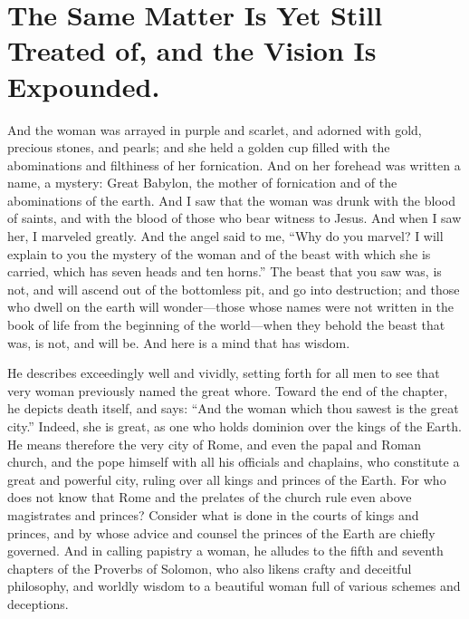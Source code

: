 \chapter[Sermon 74. The Same Matter Is Yet Still Treated of, and the Vision Is Expounded.]{The Same Matter Is Yet Still Treated of, and the Vision Is Expounded.}
\label{sermon:074}

And the woman was arrayed in purple and scarlet, and adorned with gold, precious stones, and pearls; and she held a golden cup filled with the abominations and filthiness of her fornication. And on her forehead was written a name, a mystery: Great Babylon, the mother of fornication and of the abominations of the earth. And I saw that the woman was drunk with the blood of saints, and with the blood of those who bear witness to Jesus. And when I saw her, I marveled greatly. And the angel said to me, “Why do you marvel? I will explain to you the mystery of the woman and of the beast with which she is carried, which has seven heads and ten horns.” The beast that you saw was, is not, and will ascend out of the bottomless pit, and go into destruction; and those who dwell on the earth will wonder—those whose names were not written in the book of life from the beginning of the world—when they behold the beast that was, is not, and will be. And here is a mind that has wisdom.

He describes exceedingly well and vividly, setting forth for all men to see that very woman previously named the great whore. Toward the end of the chapter, he depicts death itself, and says: “And the woman which thou sawest is the great city.” Indeed, she is great, as one who holds dominion over the kings of the Earth. He means therefore the very city of Rome, and even the papal and Roman church, and the pope himself with all his officials and chaplains, who constitute a great and powerful city, ruling over all kings and princes of the Earth. For who does not know that Rome and the prelates of the church rule even above magistrates and princes? Consider what is done in the courts of kings and princes, and by whose advice and counsel the princes of the Earth are chiefly governed. And in calling papistry a woman, he alludes to the fifth and seventh chapters of the Proverbs of Solomon, who also likens crafty and deceitful philosophy, and worldly wisdom to a beautiful woman full of various schemes and deceptions.


